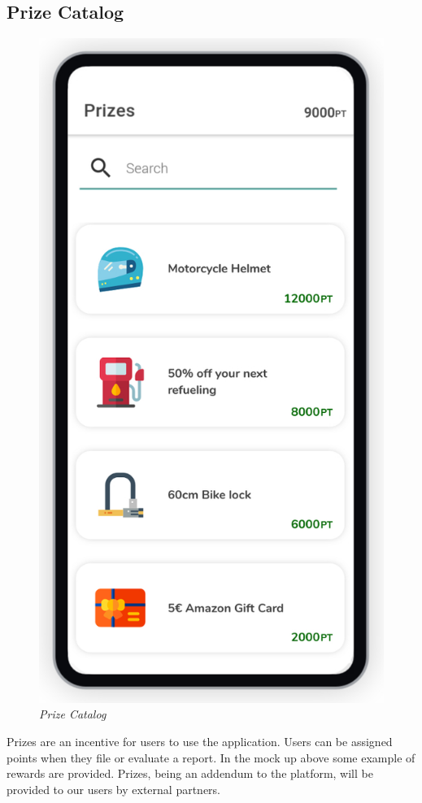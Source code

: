 \subsection{Prize Catalog}
\begin{figure}[H]
  \centering
  \includegraphics[origin=c,width=\textwidth,height=.90\textheight,keepaspectratio]{DD_Images/UserInterface/Catalog.jpg}
  \caption{\textit{Prize Catalog}}
\end{figure}

Prizes are an incentive for users to use the application. Users can be assigned points when they file or evaluate a report.
In the mock up above some example of rewards are provided. Prizes, being an addendum to the platform,
will be provided to our users by external partners.